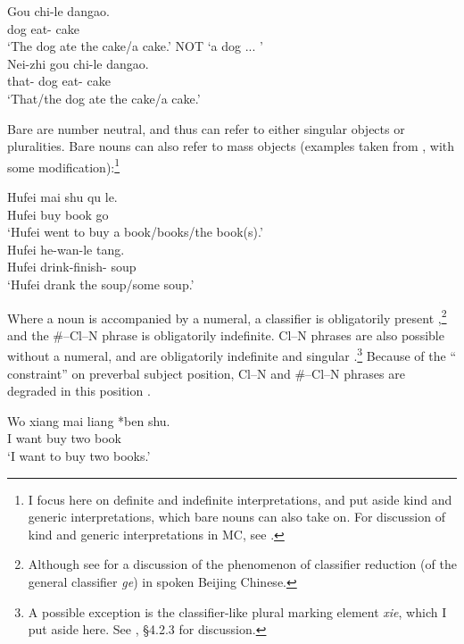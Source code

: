 \documentclass[output=paper
,modfonts
,nonflat]{langsci/langscibook}
\begin{document}
\ea \label{ex:hall:3}
\ea \label{ex:hall:3a}
\gll Gou chi-le dangao. \\
 dog eat-{} cake \\
\glt `The dog ate the cake/a cake.' NOT `a dog ... ' \\
\ex \label{ex:hall:3b}
\gll Nei-zhi gou chi-le dangao. \\
that-{} dog eat-{} cake \\
\glt `That/the dog ate the cake/a cake.' \\
\z
\z

Bare  are number neutral, and thus can refer to either singular objects or pluralities. Bare nouns can also refer to mass objects (examples taken from \citealt{ChengSybesma1999}, with some modification):\footnote{I focus here on definite and indefinite interpretations, and put aside kind and generic interpretations, which bare nouns can also take on. For discussion of kind and generic interpretations in MC, see \citet{Krifka1995}.}

\ea \label{ex:hall:4}
\ea
\gll Hufei mai shu qu le.\\
 Hufei buy book go {}\\
\glt `Hufei went to buy a book/books/the book(s).'\\

\ex
\gll Hufei he-wan-le tang.\\
 Hufei drink-finish-{} soup\\
\glt `Hufei drank the soup/some soup.'\\
\z
\z


Where a noun is accompanied by a numeral, a classifier is obligatorily present ,\footnote{Although see \citet{Tao2006} for a discussion of the phenomenon of classifier reduction (of the general classifier \textit{ge}) in spoken Beijing  Chinese.} and the \#--Cl--N phrase is obligatorily indefinite. Cl--N phrases are also possible without a numeral, and are obligatorily indefinite and singular .\footnote{A possible exception is the classifier-like plural marking element \textit{xie}, which I put aside here. See \citet{Hall2015}, \S4.2.3 for discussion.} Because of the `` constraint'' on preverbal subject position, Cl--N and \#--Cl--N phrases are degraded in this position . 

\ea \label{ex:hall:5}
\gll 
Wo xiang mai liang \textnormal{*}{\op}ben{\cp} shu.\\
I want buy two  book\\
\glt 
`I want to buy two books.'\\
\z
\end{document}
